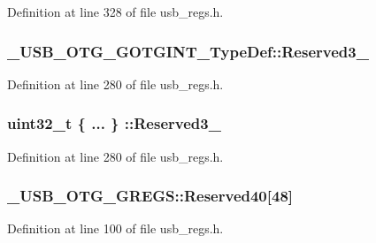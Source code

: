 Definition at line 328 of file usb\-\_\-regs.\-h.

\hypertarget{group___u_s_b___o_t_g___d_r_i_v_e_r_gad5f21fa6443d761dd45cf6056dbbadc3}{
\subsubsection[{Reserved3\-\_\-7}]{ \-\_\-\-U\-S\-B\-\_\-\-O\-T\-G\-\_\-\-G\-O\-T\-G\-I\-N\-T\-\_\-\-Type\-Def\-::\-Reserved3\-\_}}\label{group___u_s_b___o_t_g___d_r_i_v_e_r_gad5f21fa6443d761dd45cf6056dbbadc3}


Definition at line 280 of file usb\-\_\-regs.\-h.

\hypertarget{group___u_s_b___o_t_g___d_r_i_v_e_r_ga73e8e8815346e917def8c417623fa449}{
\subsubsection[{Reserved3\-\_\-7}]{\setlength{\rightskip}{0pt plus 5cm}uint32\-\_\-t \{ ... \} \-::Reserved3\-\_}}\label{group___u_s_b___o_t_g___d_r_i_v_e_r_ga73e8e8815346e917def8c417623fa449}


Definition at line 280 of file usb\-\_\-regs.\-h.

\hypertarget{group___u_s_b___o_t_g___d_r_i_v_e_r_gad08bd7ddde680e062b2a9f274beadd6e}{
\subsubsection[{Reserved40}]{ \-\_\-\-U\-S\-B\-\_\-\-O\-T\-G\-\_\-\-G\-R\-E\-G\-S\-::\-Reserved40\mbox{[}48\mbox{]}}}\label{group___u_s_b___o_t_g___d_r_i_v_e_r_gad08bd7ddde680e062b2a9f274beadd6e}


Definition at line 100 of file usb\-\_\-regs.\-h.

